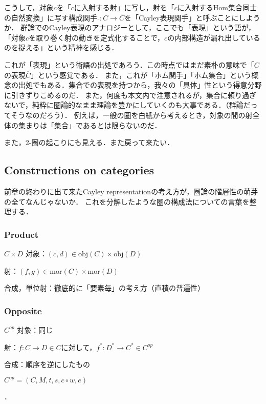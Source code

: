 \documentclass[uplatex, dvipdfmx]{jsarticle}
\begin{document}
\begin{remark*}
    こうして，対象$c$を「$c$に入射する射」に写し，射を「$c$に入射するHom集合同士の自然変換」に写す構成関手$\overline{　}:C\to\overline{C}$を「Cayley表現関手」と呼ぶことにしようか．
    群論でのCayley表現のアナロジーとして，ここでも「表現」という語が，「対象$c$を取り巻く射の動きを定式化することで，$c$の内部構造が漏れ出しているのを捉える」という精神を感じる．

    これが「表現」という術語の出処であろう．この時点ではまだ素朴の意味で「$C$の表現$\overline{C}$」という感覚である．
    また，これが「ホム関手」「ホム集合」という概念の出処でもある．集合での表現を持つから，我々の「具体」性という得意分野に引きずりこめるのだ．
    また，何度も本文内で注意されるが，集合に頼り過ぎないで，純粋に圏論的なまま理論を豊かにしていくのも大事である．（群論だってそうなのだろう）．
    例えば，一般の圏を白紙から考えるとき，対象の間の射全体の集まりは「集合」であるとは限らないのだ．

    また，2-圏の起こりにも見える．また戻って来たい．
\end{remark*}

\subsection{Constructions on categories}

前章の終わりに出て来たCayley representationの考え方が，圏論の階層性の萌芽の全てなんじゃないか．
これを分解したような圏の構成法についての言葉を整理する．


\subsubsection{Product}

\begin{itembox}[l]{$C\times D$}
    対象：$(c,d)\in \mathrm{obj}(C)\times \mathrm{obj}(D)$

    射：$(f,g)\in \mathrm{mor}(C)\times\mathrm{mor}(D)$

    合成，単位射：徹底的に「要素毎」の考え方（直積の普遍性）
\end{itembox}

\subsubsection{Opposite}

\begin{itembox}[l]{$C^{op}$}
    対象：同じ

    射：$f:C\to D\in C$に対して，$f^*:D^*\to C^*\in C^{op}$

    合成：順序を逆にしたもの

    $C^{op}=(C,M,t,s,c\circ w,e)$
\end{itembox}．
\end{document}
